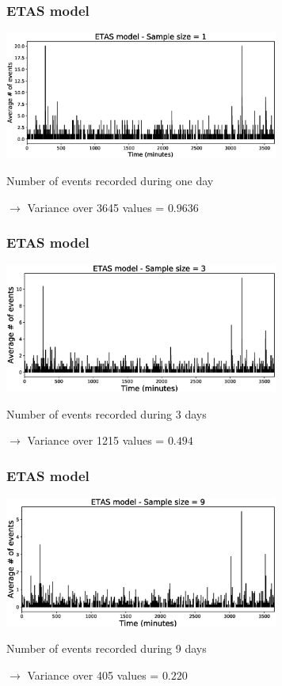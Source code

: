 \documentclass{beamer}
\begin{document}
	\begin{frame}
		\frametitle{ETAS model}
		\begin{center}
			\includegraphics[width=9cm, trim={1cm 0cm 3cm 0cm}, clip]{longrange/ETAS_1.eps}
		\end{center}
		Number of events recorded during one day

		$\rightarrow$ Variance over 3645 values = $0.9636$
	\end{frame}

	\begin{frame}
		\frametitle{ETAS model}
		\begin{center}
			\includegraphics[width=9cm, trim={1cm 0cm 3cm 0cm}, clip]{longrange/ETAS_2.eps}
		\end{center}
		Number of events recorded during 3 days

		$\rightarrow$ Variance over 1215 values = $0.494$
	\end{frame}

	\begin{frame}
		\frametitle{ETAS model}
		\begin{center}
			\includegraphics[width=9cm, trim={1cm 0cm 3cm 0cm}, clip]{longrange/ETAS_3.eps}
		\end{center}
		Number of events recorded during 9 days

		$\rightarrow$ Variance over 405 values = $0.220$
	\end{frame}
\end{document}
